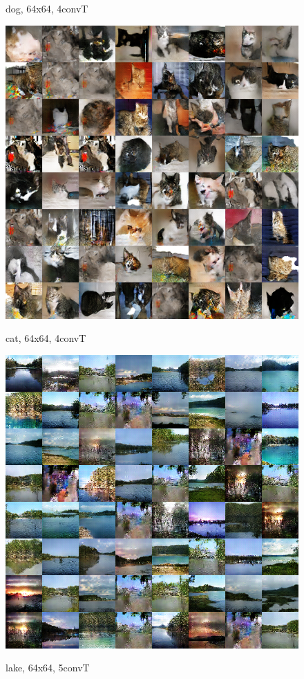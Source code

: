 \documentclass{article}
\begin{document}
\begin{CJK*}{UTF8}{gbsn}
\begin{figure}[htbp]
\begin{minipage}{0.5\linewidth}
			\caption{dog, 64x64, 4convT}
		\end{minipage}
		\begin{minipage}{0.5\linewidth}
			\label{ca}
			\centering\includegraphics[scale=0.35]{res/cat.png}
			\caption{cat, 64x64, 4convT}
		\end{minipage}
		\begin{minipage}{0.5\linewidth}
			\label{la}
			\centering\includegraphics[scale=0.37]{res/lake_38000.png}
			\caption{lake, 64x64, 5convT}
		\end{minipage}
	\end{figure}
	

\end{CJK*}
\end{document}
